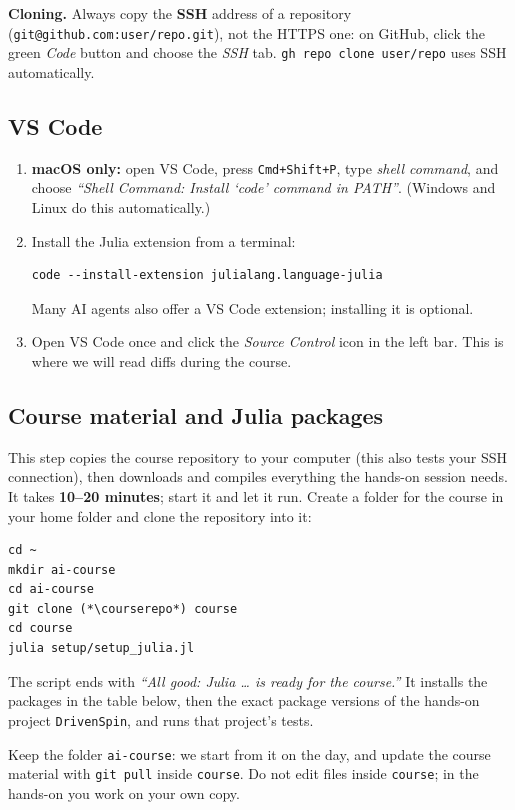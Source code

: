 \documentclass[11pt,a4paper]{article}
\makeatletter
\newcommand{\courserepo}{\detokenize{git@github.com:marcelojbp/physics_RSE_and_AI.git}}  %
\newcommand{\cmd}[1]{\texttt{#1}}
\makeatother
\begin{document}
\textbf{Cloning.} Always copy the \textbf{SSH} address of a repository
(\cmd{git@github.com:user/repo.git}), not the HTTPS one: on GitHub, click the green
\emph{Code} button and choose the \emph{SSH} tab. \cmd{gh repo clone user/repo} uses
SSH automatically.

\subsection{VS Code}
\begin{enumerate}
  \item \textbf{macOS only:} open VS Code, press \cmd{Cmd+Shift+P}, type
        \emph{shell command}, and choose
        \emph{``Shell Command: Install `code' command in PATH''}.
        (Windows and Linux do this automatically.)
  \item Install the Julia extension from a terminal:
\begin{lstlisting}
code --install-extension julialang.language-julia
\end{lstlisting}
        Many AI agents also offer a VS Code extension; installing it is optional.
  \item Open VS Code once and click the \emph{Source Control} icon in the left bar.
        This is where we will read diffs during the course.
\end{enumerate}

\subsection{Course material and Julia packages}\label{sec:julia-pkgs}
This step copies the course repository to your computer (this also tests your SSH
connection), then downloads and compiles everything the hands-on session needs. It
takes \textbf{10--20 minutes}; start it and let it run. Create a folder for the
course in your home folder and clone the repository into it:
\begin{lstlisting}
cd ~
mkdir ai-course
cd ai-course
git clone (*\courserepo*) course
cd course
julia setup/setup_julia.jl
\end{lstlisting}
The script ends with \emph{``All good: Julia \ldots{} is ready for the course.''}
It installs the packages in the table below, then the exact package versions of the
hands-on project \cmd{DrivenSpin}, and runs that project's tests.

Keep the folder \cmd{ai-course}: we start from it on the day, and update the course
material with \cmd{git pull} inside \cmd{course}. Do not edit files inside
\cmd{course}; in the hands-on you work on your own copy.
\end{document}
